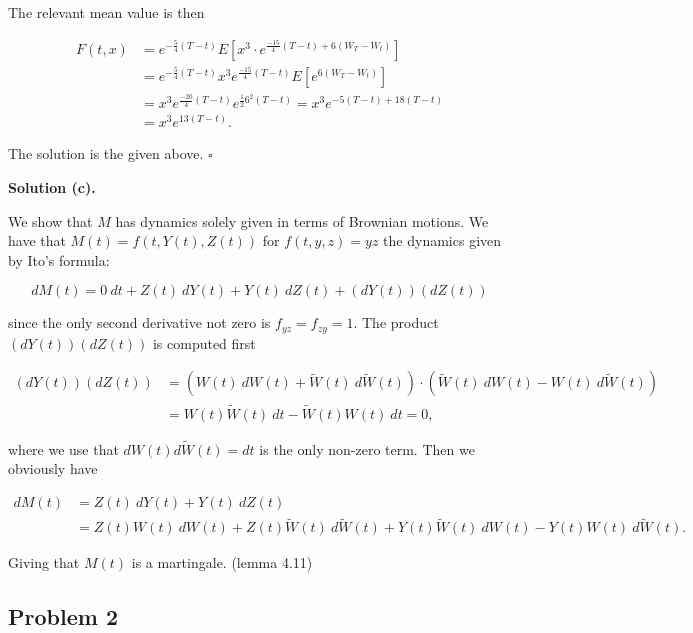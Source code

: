 \documentclass[
]{book}
\begin{document}
The relevant mean value is then

\begin{align*}
F(t,x)&=e^{-\frac{5}{4}(T-t)}E\left[x^3\cdot e^{\frac{-15}{4}(T-t)+6(W_T-W_t)}\right]\\
&=e^{-\frac{5}{4}(T-t)}x^3e^{\frac{-15}{4}(T-t)}E\left[e^{6(W_T-W_t)}\right]\\
&=x^3e^{\frac{-20}{4}(T-t)}e^{\frac{1}{2}6^2(T-t)}=x^3e^{-5(T-t)+18(T-t)}\\
&=x^3e^{13(T-t)}.
\end{align*}

The solution is the given above. \(\square\)

\noindent\makebox[\linewidth]{\rule{\textwidth}{0.4pt}}

\textbf{Solution (c).}

We show that \(M\) has dynamics solely given in terms of Brownian motions. We have that \(M(t)=f(t,Y(t),Z(t))\) for \(f(t,y,z)=yz\) the dynamics given by Ito's formula:

\[
dM(t)=0\ dt+Z(t)\ dY(t)+Y(t)\ dZ(t)+(dY(t))(dZ(t))
\]

since the only second derivative not zero is \(f_{yz}=f_{zy}=1\). The product \((dY(t))(dZ(t))\) is computed first

\begin{align*}
(dY(t))(dZ(t))&=(W(t)\ dW(t)+\widetilde{W}(t)\ d\widetilde{W}(t))\cdot(\widetilde{W}(t)\ dW(t)-W(t)\ d\widetilde{W}(t))\\
&=W(t)\widetilde{W}(t)\ dt-\widetilde{W}(t)W(t)\ dt=0,
\end{align*}

where we use that \(dW(t)d\widetilde{W}(t)=dt\) is the only non-zero term. Then we obviously have

\begin{align*}
dM(t)&=Z(t)\ dY(t)+Y(t)\ dZ(t)\\
&=Z(t)W(t)\ dW(t)+Z(t)\widetilde{W}(t)\ d\widetilde{W}(t)+Y(t)\widetilde{W}(t)\ dW(t)-Y(t)W(t)\ d\widetilde{W}(t).
\end{align*}

Giving that \(M(t)\) is a martingale. (lemma 4.11)

\noindent\makebox[\linewidth]{\rule{\textwidth}{0.4pt}}

\hypertarget{problem-2-1}{%
\subsection{Problem 2}\label{problem-2-1}}
\end{document}
